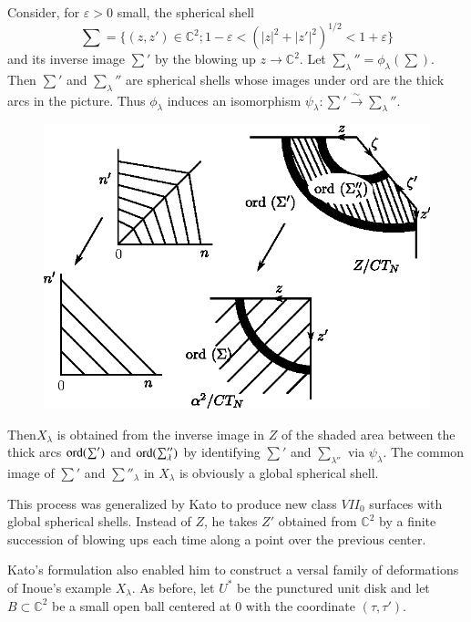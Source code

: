     Consider, for $\varepsilon > 0$ small, the spherical shell 
    $$
    \sum= \{ (z, z' ) \in  \mathbb{C} ^2  ; 1 - \varepsilon<
    (|z|^2 + |z'|^2)^{1/2}< 1 + \varepsilon\} 
    $$ 
   and its inverse image $\sum'$ by the blowing up $z \rightarrow
   \mathbb{C}^2$. Let $\sum_\lambda'' = \phi_\lambda (\sum)$. Then
   $\sum'$ and $\sum_\lambda''$ are 
   spherical shells whose images under ord are the thick arcs in the
   picture. Thus $\phi_\lambda$ induces an isomorphism $ \psi_\lambda
   : \sum' \xrightarrow{\sim} \sum_\lambda''$.  
   \begin{figure}[H]
\centering 
\includegraphics{vol58-fig/fig58-74.eps} 
\end{figure}
   
   Then\pageoriginale $X_\lambda$ is obtained from the inverse image
   in $Z$ of the shaded area between the thick arcs $\operatorname{ord} (\sum')$ and $\operatorname{ord}
   (\sum''_{\lambda})$ by identifying $\sum'$ and $\sum_{\lambda''} 
   $ via $\psi_\lambda$. The common image of $\sum'$ and
   $\sum''_\lambda$ in $X_\lambda$ is obviously a global spherical
   shell.     
   
   This process was generalized by Kato \cite{keyK2}  to produce new class
   $VII_0$ surfaces with global spherical shells. Instead of $Z$, he
   takes $Z'$ obtained from  $\mathbb{C}^2$  by a finite
   succession of blowing ups each time along a point over the previous
   center. 
   
   Kato's formulation also enabled him to construct a versal family of
   deformations of Inoue's example $X_\lambda$. As before, let $U^*$
   be the punctured unit disk and let $B \subset \mathbb{C}^2 $
 be a small open ball centered at 0 with the coordinate
   $(\tau, \tau')$.  
   
